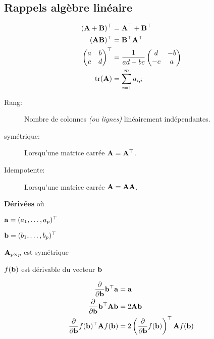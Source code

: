 \documentclass[10pt, french]{article}
\begin{document}
\begin{multicols*}{3} 
\section*{Rappels algèbre linéaire}

\begin{align*}
	\mathbf{(A + B)^{\top}} &= \mathbf{A}^{\top} + \mathbf{B}^{\top} \\
	\mathbf{(AB)^{\top}} &= \mathbf{B}^{\top}\mathbf{A}^{\top} \\
	\begin{pmatrix}
		a	&	b	\\
		c	&	d	\\
	\end{pmatrix}^{\top}
	&=
	\frac{1}{ad - bc} 
	\begin{pmatrix}
		d	&	-b	\\
		-c	&	a	\\
	\end{pmatrix}	\\
	\text{tr}(\mathbf{A}) &= \sum^{m}_{i = 1} a_{i, i} \\
\end{align*}

\begin{description}
	\item[Rang:] Nombre de colonnes \textit{(ou lignes)} linéairement indépendantes.
	\item[symétrique:] Lorsqu'une matrice carrée $\mathbf{A} = \mathbf{A}^{\top}$.
	\item[Idempotente:] Lorsqu'une matrice carrée $\mathbf{A} = \mathbf{A}\mathbf{A}$.
\end{description}

\textbf{Dérivées} où 
\begin{description}
	\item $\mathbf{a} = (a_{1}, \dots, a_{p})^{\top}$ 
	\item $\mathbf{b} = (b_{1}, \dots, b_{p})^{\top}$ 
	\item $\mathbf{A}_{p \times p}$ est symétrique 
	\item $f(\mathbf{b})$ est dérivable du vecteur $\mathbf{b}$
\end{description}
\begin{align*}
	\frac{\partial}{\partial \mathbf{b}} \mathbf{b^{\top}} \mathbf{a} &= \mathbf{a}	\\
	\frac{\partial}{\partial \mathbf{b}} \mathbf{b^{\top}} \mathbf{A} \mathbf{b} &= 2 \mathbf{A}\mathbf{b}	\\
	\frac{\partial}{\partial \mathbf{b}} f(\mathbf{b})^{\top} \mathbf{A} f(\mathbf{b}) &= 2 \left(\frac{\partial}{\partial \mathbf{b}} f(\mathbf{b}) \right)^{\top} \mathbf{A} f(\mathbf{b})	\\
\end{align*}


\end{multicols*}
\end{document}
